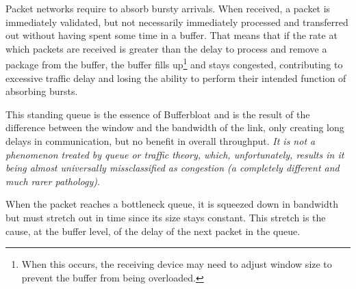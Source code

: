Packet networks require to absorb bursty arrivals. When received, a packet is immediately validated, but
not necessarily immediately processed and transferred out without having spent some time in a
buffer. That means that if the rate at which packets are received is greater
than the delay to process and remove a package from the buffer, the buffer
fills up\footnote{When this occurs, the receiving device may need to
adjust window size to prevent the buffer from being overloaded.} and stays
congested, contributing to excessive traffic delay and losing the ability to
perform their intended function of absorbing bursts.

This standing queue is the essence of Bufferbloat and is the result of the
difference between the window and the bandwidth of the link, only creating
long delays in communication, but no benefit in overall throughput. \emph{It
is not a phenomenon treated by queue or traffic theory, which, unfortunately,
results in it being almost universally missclassified as congestion (a
completely different and much rarer pathology)}\cite{CACMStaff}.

When the packet reaches a bottleneck queue, it is squeezed down in bandwidth but
must stretch out in time since its size stays constant. This stretch is the
cause, at the buffer level, of the delay of the next packet in the queue.
